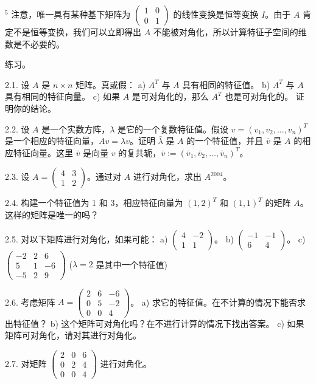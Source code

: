 $^5$ 注意，唯一具有某种基下矩阵为 $\begin{pmatrix} 1 & 0 \\ 0 & 1 \end{pmatrix}$ 的线性变换是恒等变换 $I$。由于 $A$ 肯定不是恒等变换，我们可以立即得出 $A$ 不能被对角化，所以计算特征子空间的维数是不必要的。


练习。

2.1. 设 $A$ 是 $n \times n$ 矩阵。真或假：
a) $A^T$ 与 $A$ 具有相同的特征值。
b) $A^T$ 与 $A$ 具有相同的特征向量。
c) 如果 $A$ 是可对角化的，那么 $A^T$ 也是可对角化的。
证明你的结论。

2.2. 设 $A$ 是一个实数方阵，$\lambda$ 是它的一个复数特征值。假设 $v = (v_1, v_2, \dots, v_n)^T$ 是一个相应的特征向量，$Av = \lambda v$。证明 $\bar{\lambda}$ 是 $A$ 的一个特征值，并且 $\bar{v}$ 是 $A$ 的相应特征向量。这里 $\bar{v}$ 是向量 $v$ 的复共轭，$\bar{v} := (\bar{v}_1, \bar{v}_2, \dots, \bar{v}_n)^T$。

2.3. 设 $A = \begin{pmatrix} 4 & 3 \\ 1 & 2 \end{pmatrix}$。通过对 $A$ 进行对角化，求出 $A^{2004}$。

2.4. 构建一个特征值为 1 和 3，相应特征向量为 $(1, 2)^T$ 和 $(1, 1)^T$ 的矩阵 $A$。这样的矩阵是唯一的吗？

2.5. 对以下矩阵进行对角化，如果可能：
a) $\begin{pmatrix} 4 & -2 \\ 1 & 1 \end{pmatrix}$。
b) $\begin{pmatrix} -1 & -1 \\ 6 & 4 \end{pmatrix}$。
c) $\begin{pmatrix} -2 & 2 & 6 \\ 5 & 1 & -6 \\ -5 & 2 & 9 \end{pmatrix}$ ($\lambda = 2$ 是其中一个特征值)

2.6. 考虑矩阵 $A = \begin{pmatrix} 2 & 6 & -6 \\ 0 & 5 & -2 \\ 0 & 0 & 4 \end{pmatrix}$。
a) 求它的特征值。在不计算的情况下能否求出特征值？
b) 这个矩阵可对角化吗？在不进行计算的情况下找出答案。
c) 如果矩阵可对角化，请对其进行对角化。



2.7. 对矩阵 $\begin{pmatrix} 2 & 0 & 6 \\ 0 & 2 & 4 \\ 0 & 0 & 4 \end{pmatrix}$ 进行对角化。

